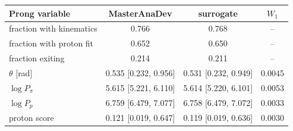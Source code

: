 \begin{tabular}{lccc}
\toprule
Prong variable & MasterAnaDev & surrogate & $W_1$ \\
\midrule
fraction with kinematics & 0.766 & 0.768 & -- \\
fraction with proton fit & 0.652 & 0.650 & -- \\
fraction exiting & 0.214 & 0.211 & -- \\
$\theta$ [rad] & 0.535 [0.232, 0.956] & 0.531 [0.232, 0.949] & 0.0045 \\
$\log P_\pi$ & 5.615 [5.221, 6.110] & 5.614 [5.220, 6.101] & 0.0053 \\
$\log P_p$ & 6.759 [6.479, 7.077] & 6.758 [6.479, 7.072] & 0.0033 \\
proton score & 0.121 [0.019, 0.647] & 0.119 [0.019, 0.636] & 0.0030 \\
\bottomrule
\end{tabular}
